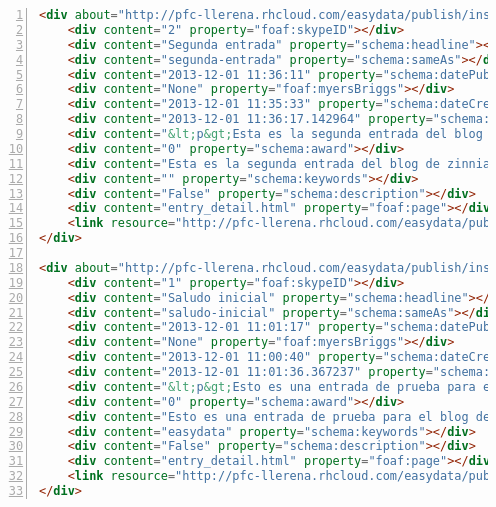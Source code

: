\begin{lstlisting}[frame=L, language=HTML, basicstyle=\footnotesize, breaklines=true, numbers=left]
<div about="http://pfc-llerena.rhcloud.com/easydata/publish/instance/zinnia/BlogPosting-Entry/2.xml" typeof="schema:BlogPosting" prefix="schema: http://schema.org/ foaf: http://xmlns.com/foaf/0.1/">
    <div content="2" property="foaf:skypeID"></div>
    <div content="Segunda entrada" property="schema:headline"></div>
    <div content="segunda-entrada" property="schema:sameAs"></div>
    <div content="2013-12-01 11:36:11" property="schema:datePublished"></div>
    <div content="None" property="foaf:myersBriggs"></div>
    <div content="2013-12-01 11:35:33" property="schema:dateCreated"></div>
    <div content="2013-12-01 11:36:17.142964" property="schema:dateModified"></div>
    <div content="&lt;p&gt;Esta es la segunda entrada del blog de zinnia.&lt;/p&gt;&lt;p&gt;Ten mucha suerte en tu Proyecto Fin de Carrera.&lt;/p&gt;" property="schema:text"></div>
    <div content="0" property="schema:award"></div>
    <div content="Esta es la segunda entrada del blog de zinnia.Ten mucha suerte en tu Proyecto Fin de Carrera." property="schema:sameAs"></div>
    <div content="" property="schema:keywords"></div>
    <div content="False" property="schema:description"></div>
    <div content="entry_detail.html" property="foaf:page"></div>
    <link resource="http://pfc-llerena.rhcloud.com/easydata/publish/instance/zinnia/BlogPosting-Entry/1.xml" rel="schema:about">
</div>

<div about="http://pfc-llerena.rhcloud.com/easydata/publish/instance/zinnia/BlogPosting-Entry/1.xml" typeof="schema:BlogPosting" prefix="schema: http://schema.org/ foaf: http://xmlns.com/foaf/0.1/">
    <div content="1" property="foaf:skypeID"></div>
    <div content="Saludo inicial" property="schema:headline"></div>
    <div content="saludo-inicial" property="schema:sameAs"></div>
    <div content="2013-12-01 11:01:17" property="schema:datePublished"></div>
    <div content="None" property="foaf:myersBriggs"></div>
    <div content="2013-12-01 11:00:40" property="schema:dateCreated"></div>
    <div content="2013-12-01 11:01:36.367237" property="schema:dateModified"></div>
    <div content="&lt;p&gt;Esto es una entrada de prueba para el blog de zinnia para probar junto con EasyData.&lt;/p&gt;" property="schema:text"></div>
    <div content="0" property="schema:award"></div>
    <div content="Esto es una entrada de prueba para el blog de zinnia para probar junto con EasyData." property="schema:sameAs"></div>
    <div content="easydata" property="schema:keywords"></div>
    <div content="False" property="schema:description"></div>
    <div content="entry_detail.html" property="foaf:page"></div>
    <link resource="http://pfc-llerena.rhcloud.com/easydata/publish/instance/zinnia/BlogPosting-Entry/2.xml" rel="schema:about">
</div>
\end{lstlisting}

